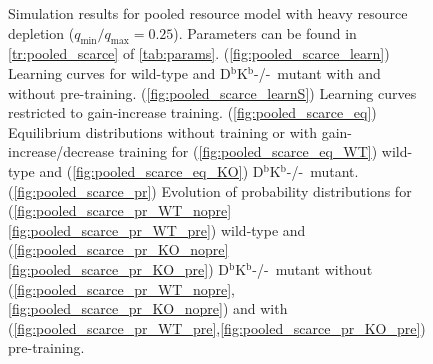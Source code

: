 \documentclass[12pt]{article}
\newcommand{\KO}{D$^\mathrm{b}$K$^\mathrm{b}$-/-}
\newcommand{\lmax}{_{\text{max}}}
\newcommand{\lmin}{_{\text{min}}}
\begin{document}
\begin{figure}
 \begin{center}
 \begin{myenuma}
  \item{}\label{fig:pooled_scarce_learn}
  \item{}\label{fig:pooled_scarce_learnS}
  \item\label{fig:pooled_scarce_eq}\begin{myenumi}
                    \item{}\label{fig:pooled_scarce_eq_WT}
                    \item{}\label{fig:pooled_scarce_eq_KO}
                  \end{myenumi}
  \item\label{fig:pooled_scarce_pr}\begin{myenumi}
                    \item{}\label{fig:pooled_scarce_pr_WT_nopre}
                    \item{}\label{fig:pooled_scarce_pr_WT_pre}
                    \item{}\label{fig:pooled_scarce_pr_KO_nopre}
                    \item{}\label{fig:pooled_scarce_pr_KO_pre}
                  \end{myenumi}
 \end{myenuma}
 \end{center}
  \caption{Simulation results for pooled resource model with heavy resource depletion ($q\lmin/q\lmax=0.25$).
  Parameters can be found in \autoref{tr:pooled_scarce} of \autoref{tab:params}.
  (\ref{fig:pooled_scarce_learn}) Learning curves for wild-type and \KO\ mutant with and without pre-training.
  (\ref{fig:pooled_scarce_learnS}) Learning curves restricted to gain-increase training.
  (\ref{fig:pooled_scarce_eq}) Equilibrium distributions without training or with gain-increase/decrease training for (\ref{fig:pooled_scarce_eq_WT}) wild-type and (\ref{fig:pooled_scarce_eq_KO}) \KO\ mutant.
  (\ref{fig:pooled_scarce_pr}) Evolution of probability distributions for (\ref{fig:pooled_scarce_pr_WT_nopre}\ref{fig:pooled_scarce_pr_WT_pre}) wild-type and  (\ref{fig:pooled_scarce_pr_KO_nopre}\ref{fig:pooled_scarce_pr_KO_pre}) \KO\ mutant without (\ref{fig:pooled_scarce_pr_WT_nopre},\ref{fig:pooled_scarce_pr_KO_nopre}) and with (\ref{fig:pooled_scarce_pr_WT_pre},\ref{fig:pooled_scarce_pr_KO_pre}) pre-training. } \label{fig:pooled_scarce}
\end{figure}
\end{document}
